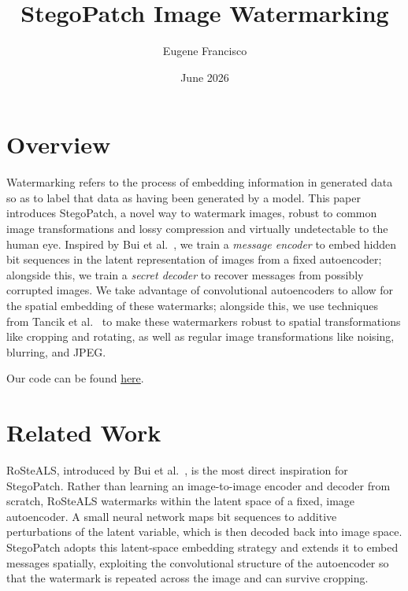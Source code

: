 \documentclass[twocolumn]{article}
\title{StegoPatch Image Watermarking}
\author{Eugene Francisco}
\date{June 2026}
\begin{document}
\maketitle

\section{Overview}

Watermarking refers to the process of embedding information in generated data so as to label that data as having been generated by a model. This paper introduces StegoPatch, a novel way to watermark images, robust to common image transformations and lossy compression and virtually undetectable to the human eye. Inspired by Bui et al.~\cite{bui2023rosteals}, we train a \textit{message encoder} to embed hidden bit sequences in the latent representation of images from a fixed autoencoder; alongside this, we train a \textit{secret decoder} to recover messages from possibly corrupted images. We take advantage of convolutional autoencoders to allow for the spatial embedding of these watermarks; alongside this, we use techniques from Tancik et al.~\cite{tancik2020stegastamp} to make these watermarkers robust to spatial transformations like cropping and rotating, as well as regular image transformations like noising, blurring, and JPEG.

Our code can be found \href{https://github.com/EugeneFrancisco/StegoPatch}{here}.


\section{Related Work}
RoSteALS, introduced by Bui et al.~\cite{bui2023rosteals}, is the most direct inspiration for StegoPatch. Rather than learning an image-to-image encoder and decoder from scratch, RoSteALS watermarks within the latent space of a fixed, image autoencoder. A small neural network maps bit sequences to additive perturbations of the latent variable, which is then decoded back into image space. StegoPatch adopts this latent-space embedding strategy and extends it to embed messages spatially, exploiting the convolutional structure of the autoencoder so that the watermark is repeated across the image and can survive cropping.
\end{document}
